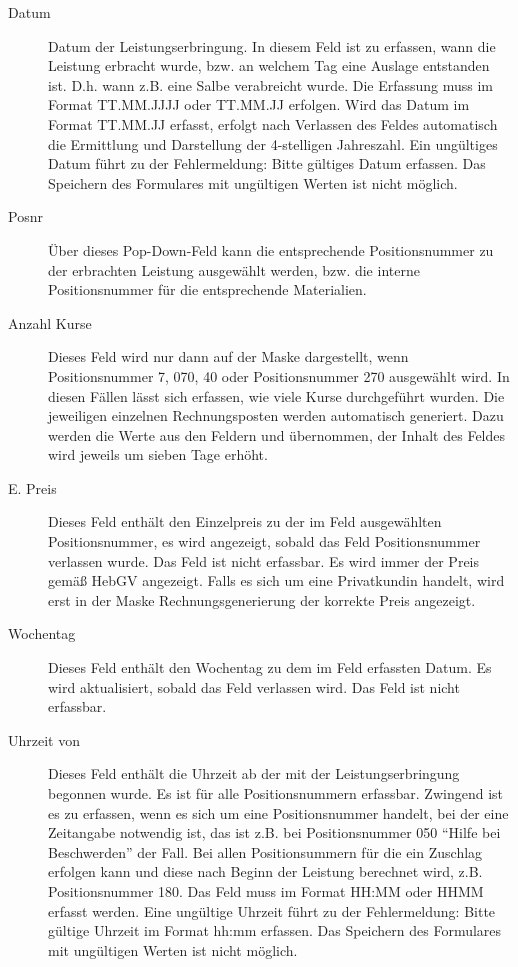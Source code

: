 \begin{description}
\item[Datum] 
Datum der Leistungserbringung. In diesem Feld ist zu erfassen, wann
die Leistung erbracht wurde, bzw. an welchem Tag eine Auslage entstanden ist.
D.h. wann z.B. eine Salbe verabreicht wurde.
Die Erfassung muss im Format TT.MM.JJJJ oder TT.MM.JJ erfolgen. 
Wird das Datum im Format TT.MM.JJ erfasst, erfolgt nach Verlassen des
Feldes automatisch die Ermittlung und Darstellung der 4-stelligen Jahreszahl.
Ein ungültiges Datum führt zu der Fehlermeldung: Bitte gültiges Datum erfassen.
Das Speichern des Formulares mit ungültigen Werten ist nicht möglich.
\item[Posnr]
Über dieses Pop-Down-Feld kann die entsprechende Positionsnummer zu der
erbrachten Leistung ausgewählt werden, bzw. die interne Positionsnummer
für die entsprechende Materialien.
\item[Anzahl Kurse]
Dieses Feld wird nur dann auf der Maske dargestellt, wenn Positionsnummer 7,
070, 40 oder Positionsnummer 270 ausgewählt wird. 
In diesen Fällen lässt sich erfassen,
wie viele Kurse durchgeführt wurden. Die jeweiligen einzelnen
Rechnungsposten werden automatisch generiert. Dazu werden die Werte aus
den Feldern  und  übernommen, 
der Inhalt des Feldes  wird jeweils um sieben Tage erhöht.
\item[E. Preis] 
Dieses Feld enthält den Einzelpreis zu der im Feld  ausgewählten
Positionsnummer, es wird angezeigt, sobald das Feld Positionsnummer
verlassen wurde. Das Feld ist nicht erfassbar. Es wird immer der
Preis gemäß HebGV angezeigt. Falls es sich um eine Privatkundin handelt,
wird erst in der Maske Rechnungsgenerierung der korrekte Preis angezeigt.
\item[Wochentag]
Dieses Feld enthält den Wochentag zu dem im Feld  erfassten Datum.
Es wird aktualisiert, sobald das Feld  verlassen wird.
Das Feld ist nicht erfassbar.
\item[Uhrzeit von]
Dieses Feld enthält die Uhrzeit ab der mit der Leistungserbringung begonnen
wurde. Es ist für alle Positionsnummern erfassbar. Zwingend ist es zu erfassen,
wenn es sich um eine Positionsnummer handelt,
bei der eine Zeitangabe notwendig ist, das ist z.B. bei Positionsnummer 050
``Hilfe bei Beschwerden'' der Fall. Bei allen Positionsummern für die ein
Zuschlag erfolgen kann und diese nach Beginn der Leistung berechnet wird, 
z.B. Positionsnummer 180. 
Das Feld muss im Format HH:MM oder
HHMM erfasst werden. Eine ungültige Uhrzeit führt zu der Fehlermeldung:
Bitte gültige Uhrzeit im Format hh:mm erfassen. Das Speichern des Formulares
mit ungültigen Werten ist nicht möglich.


\end{description}
